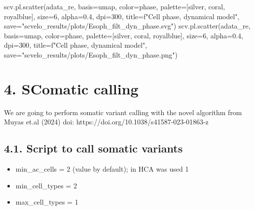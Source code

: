 \documentclass[
  letterpaper,
  DIV=11,
  numbers=noendperiod]{scrreprt}
\newenvironment{Shaded}{\begin{snugshade}}{\end{snugshade}}
\newcommand{\DecValTok}[1]{\textcolor[rgb]{0.68,0.00,0.00}{#1}}
\newcommand{\FloatTok}[1]{\textcolor[rgb]{0.68,0.00,0.00}{#1}}
\newcommand{\NormalTok}[1]{\textcolor[rgb]{0.00,0.23,0.31}{#1}}
\newcommand{\OperatorTok}[1]{\textcolor[rgb]{0.37,0.37,0.37}{#1}}
\newcommand{\SpecialStringTok}[1]{\textcolor[rgb]{0.13,0.47,0.30}{#1}}
\newcommand{\StringTok}[1]{\textcolor[rgb]{0.13,0.47,0.30}{#1}}
\providecommand{\tightlist}{%
  \setlength{\itemsep}{0pt}\setlength{\parskip}{0pt}}\usepackage{longtable,booktabs,array}
\begin{document}
\begin{Shaded}
\begin{Highlighting}[]
\NormalTok{scv.pl.scatter(adata\_re, basis}\OperatorTok{=}\StringTok{\textquotesingle{}umap\textquotesingle{}}\NormalTok{, color}\OperatorTok{=}\StringTok{\textquotesingle{}phase\textquotesingle{}}\NormalTok{, palette}\OperatorTok{=}\NormalTok{[}\StringTok{\textquotesingle{}silver\textquotesingle{}}\NormalTok{, }\StringTok{\textquotesingle{}coral\textquotesingle{}}\NormalTok{, }\StringTok{\textquotesingle{}royalblue\textquotesingle{}}\NormalTok{], size}\OperatorTok{=}\DecValTok{6}\NormalTok{, alpha}\OperatorTok{=}\FloatTok{0.4}\NormalTok{, dpi}\OperatorTok{=}\DecValTok{300}\NormalTok{, title}\OperatorTok{=}\SpecialStringTok{f"Cell phase, dynamical model"}\NormalTok{, save}\OperatorTok{=}\StringTok{"scvelo\_results/plots/Esoph\_filt\_dyn\_phase.svg"}\NormalTok{)}
\NormalTok{scv.pl.scatter(adata\_re, basis}\OperatorTok{=}\StringTok{\textquotesingle{}umap\textquotesingle{}}\NormalTok{, color}\OperatorTok{=}\StringTok{\textquotesingle{}phase\textquotesingle{}}\NormalTok{, palette}\OperatorTok{=}\NormalTok{[}\StringTok{\textquotesingle{}silver\textquotesingle{}}\NormalTok{, }\StringTok{\textquotesingle{}coral\textquotesingle{}}\NormalTok{, }\StringTok{\textquotesingle{}royalblue\textquotesingle{}}\NormalTok{], size}\OperatorTok{=}\DecValTok{6}\NormalTok{, alpha}\OperatorTok{=}\FloatTok{0.4}\NormalTok{, dpi}\OperatorTok{=}\DecValTok{300}\NormalTok{, title}\OperatorTok{=}\SpecialStringTok{f"Cell phase, dynamical model"}\NormalTok{, save}\OperatorTok{=}\StringTok{"scvelo\_results/plots/Esoph\_filt\_dyn\_phase.png"}\NormalTok{)}
\end{Highlighting}
\end{Shaded}

\chapter{4. SComatic calling}\label{scomatic-calling}

We are going to perform somatic variant calling with the novel algorithm
from Muyas et.al (2024) doi: https://doi.org/10.1038/s41587-023-01863-z

\section{4.1. Script to call somatic
variants}\label{script-to-call-somatic-variants}

\begin{itemize}
\tightlist
\item
  min\_ac\_cells = 2 (value by default); in HCA was used 1
\item
  min\_cell\_types = 2
\item
  max\_cell\_types = 1
\end{itemize}
\end{document}
